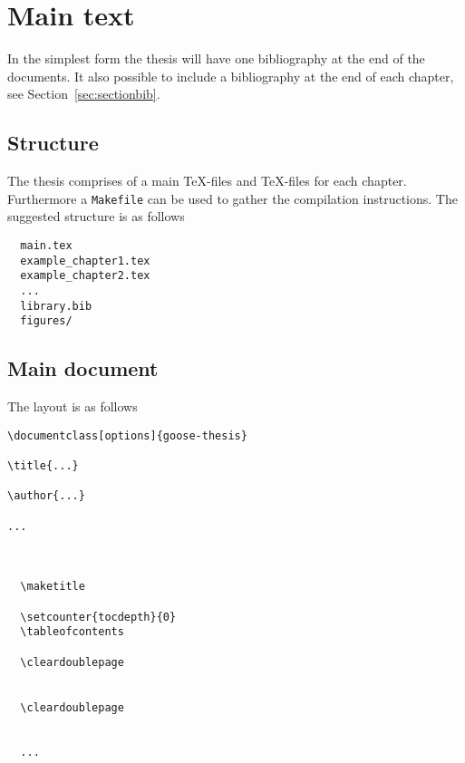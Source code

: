 \section{Main text}

In the simplest form the thesis will have one bibliography at the end of the documents. It also possible to include a bibliography at the end of each chapter, see Section~\ref{sec:sectionbib}.

\subsection{Structure}

The thesis comprises of a main \TeX-files and \TeX-files for each chapter. Furthermore a \texttt{Makefile} can be used to gather the compilation instructions. The suggested structure is as follows
%
\begin{verbatim}
  main.tex
  example_chapter1.tex
  example_chapter2.tex
  ...
  library.bib
  figures/
\end{verbatim}
%

\subsection{Main document}

The layout is as follows
\begin{mdframed}
\begin{verbatim}
\documentclass[options]{goose-thesis}

\title{...}

\author{...}

...



  \maketitle

  \setcounter{tocdepth}{0}
  \tableofcontents

  \cleardoublepage
  

  \cleardoublepage
  

  ...

  


\end{verbatim}
\end{mdframed}

